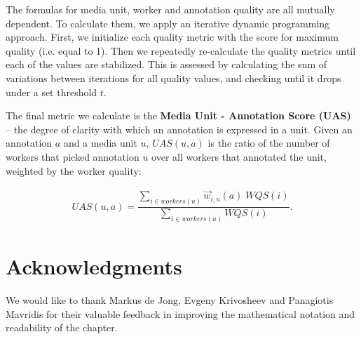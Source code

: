 The formulas for media unit, worker and annotation quality are all mutually dependent. To calculate them, we apply an iterative dynamic programming approach. First, we initialize each quality metric with the score for maximum quality (i.e. equal to 1). Then we repeatedly re-calculate the quality metrics until each of the values are stabilized. This is assessed by calculating the sum of variations between iterations for all quality values, and checking until it drops under a set threshold $t$.

The final metric we calculate is the \textbf{Media Unit - Annotation Score (UAS)} -- the degree of clarity with which an annotation is expressed in a unit. Given an annotation $a$ and a media unit $u$, $UAS(u, a)$ is the ratio of the number of workers that picked annotation $u$ over all workers that annotated the unit, weighted by the worker quality:

\begin{align}
UAS(u, a) = \dfrac{ \sum\limits_{i \in workers(u)} \vec{w}_{i,u}(a) \; WQS(i) }{ \sum\limits_{i \in workers(u)} WQS(i) }.
\end{align}


\section*{Acknowledgments}

We would like to thank Markus de Jong, Evgeny Krivosheev and Panagiotis Mavridis for their valuable feedback in improving the mathematical notation and readability of the chapter. 